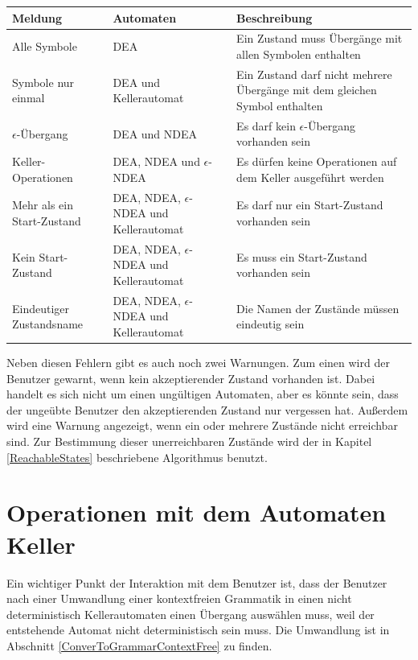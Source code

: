 \noindent
\begin{tabular}{|p{2.1cm}|p{2.7cm}|p{6.0cm}|}
  \hline
  \textbf{Meldung} &
  \textbf{Automaten} &
  \textbf{Beschreibung} \\
  \hline
  \hline
  Alle Symbole &
  DEA &
  Ein Zustand muss Übergänge mit allen Symbolen enthalten \\
  \hline
  Symbole nur einmal &
  DEA und Kellerautomat &
  Ein Zustand darf nicht mehrere Übergänge mit dem gleichen Symbol enthalten \\
  \hline
  $\epsilon$-Übergang &
  DEA und NDEA &
  Es darf kein $\epsilon$-Übergang vorhanden sein \\
  \hline
  Keller-Operationen &
  DEA, NDEA und $\epsilon$-NDEA &
  Es dürfen keine Operationen auf dem Keller ausgeführt werden \\
  \hline
  Mehr als ein Start-Zustand &
  DEA, NDEA, $\epsilon$-NDEA und Kellerautomat&
  Es darf nur ein Start-Zustand vorhanden sein \\
  \hline
  Kein Start-Zustand &
  DEA, NDEA, $\epsilon$-NDEA und Kellerautomat&
  Es muss ein Start-Zustand vorhanden sein \\
  \hline
  Eindeutiger Zustandsname &
  DEA, NDEA, $\epsilon$-NDEA und Kellerautomat&
  Die Namen der Zustände müssen eindeutig sein \\
  \hline
\end{tabular}
\vspace{10pt}

\noindent
Neben diesen Fehlern gibt es auch noch zwei Warnungen. Zum einen wird der
Benutzer gewarnt, wenn kein akzeptierender Zustand vorhanden ist. Dabei handelt
es sich nicht um einen ungültigen Automaten, aber es könnte sein, dass der
ungeübte Benutzer den akzeptierenden Zustand nur vergessen hat. Außerdem wird
eine Warnung angezeigt, wenn ein oder mehrere Zustände nicht erreichbar sind.
Zur Bestimmung dieser unerreichbaren Zustände wird der in Kapitel
\ref{ReachableStates} beschriebene Algorithmus benutzt.\vspace{10pt}


\section{Operationen mit dem Automaten Keller}\label{InteractionPDA}

Ein wichtiger Punkt der Interaktion mit dem Benutzer ist, dass der Benutzer nach
einer Umwandlung einer kontextfreien Grammatik in einen nicht deterministisch
Kellerautomaten einen Übergang auswählen muss, weil der entstehende Automat
nicht deterministisch sein muss. Die Umwandlung ist in Abschnitt
\ref{ConverToGrammarContextFree} zu finden.\vspace{10pt}

